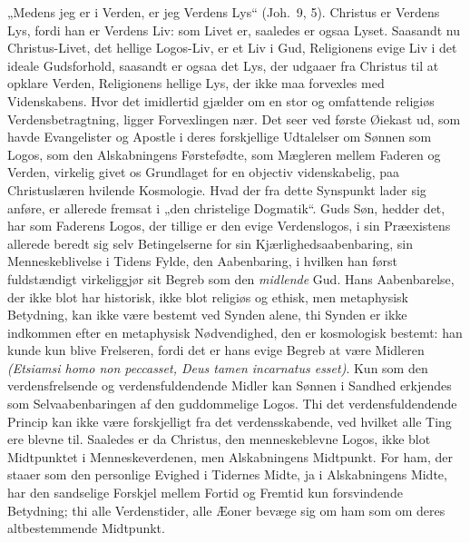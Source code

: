 \documentclass[12pt]{book}
\begin{document}
„Medens jeg er i Verden, er jeg Verdens Lys“ (Joh.\ 9, 5). Christus
er Verdens Lys, fordi han er Verdens Liv: som Livet er, saaledes er
ogsaa Lyset. Saasandt nu Christus-Livet, det hellige Logos-Liv, er
et Liv i Gud, Religionens evige Liv i det ideale Gudsforhold,
saasandt er ogsaa det Lys, der udgaaer fra Christus til at opklare
Verden, Religionens hellige Lys, der ikke maa forvexles med
Videnskabens. Hvor det imidlertid gjælder om en stor og omfattende
religiøs Verdensbetragtning, ligger Forvexlingen nær. Det seer ved
første Øiekast ud, som havde Evangelister og Apostle i deres
forskjellige Udtalelser om Sønnen som Logos, som den Alskabningens
Førstefødte, som Mægleren mellem Faderen og Verden, virkelig givet
os Grundlaget for en objectiv videnskabelig, paa Christuslæren
hvilende Kosmologie. Hvad der fra dette Synspunkt lader sig anføre,
er allerede fremsat i „den christelige Dogmatik“. Guds Søn, hedder
det, har som Faderens Logos, der tillige er den evige Verdenslogos,
i sin Præexistens allerede beredt sig selv Betingelserne for sin
Kjærlighedsaabenbaring, sin Menneskeblivelse i Tidens Fylde, den
Aabenbaring, i hvilken han først fuldstændigt virkeliggjør sit
Begreb som den \emph{midlende} Gud.
Hans Aabenbarelse, der ikke
blot har historisk, ikke blot religiøs og ethisk, men metaphysisk
Betydning, kan ikke være bestemt ved Synden alene, thi Synden er
ikke indkommen efter en metaphysisk Nødvendighed, den er
kosmologisk bestemt: han kunde kun blive Frelseren, fordi det er
hans evige Begreb at være Midleren \textit{(Etsiamsi homo non
peccasset, Deus tamen incarnatus esset)}. Kun som den
verdensfrelsende og verdensfuldendende Midler kan Sønnen i Sandhed
erkjendes som Selvaabenbaringen af den guddommelige Logos. Thi det
verdensfuldendende
Princip kan ikke være forskjelligt fra det verdensskabende, ved
hvilket alle Ting ere blevne til. Saaledes er da Christus, den
menneskeblevne Logos, ikke blot Midtpunktet i Menneskeverdenen, men
Alskabningens Midtpunkt. For ham, der staaer som den personlige
Evighed i Tidernes Midte, ja i Alskabningens Midte, har den
sandselige Forskjel mellem Fortid og Fremtid kun forsvindende
Betydning; thi alle Verdenstider, alle Æoner bevæge sig om ham som
om deres altbestemmende Midtpunkt.
\end{document}
